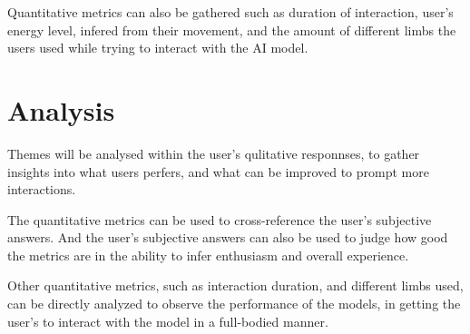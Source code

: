 \documentclass[final,5p,times,twocolumn,authoryear]{article}
\begin{document}
Quantitative metrics can also be gathered such as duration of
interaction, user's energy level, infered from their movement, and the
amount of different limbs the users used while trying to interact with
the AI model.

\section{Analysis}

Themes will be analysed within the user's qulitative responnses, to
gather insights into what users perfers, and what can be improved to
prompt more interactions.

The quantitative metrics can be used to cross-reference the user's
subjective answers. And the user's subjective answers can also be used
to judge how good the metrics are in the ability to infer enthusiasm and
overall experience.

Other quantitative metrics, such as interaction duration, and different
limbs used, can be directly analyzed to observe the performance of the
models, in getting the user's to interact with the model in a
full-bodied manner.
\end{document}
